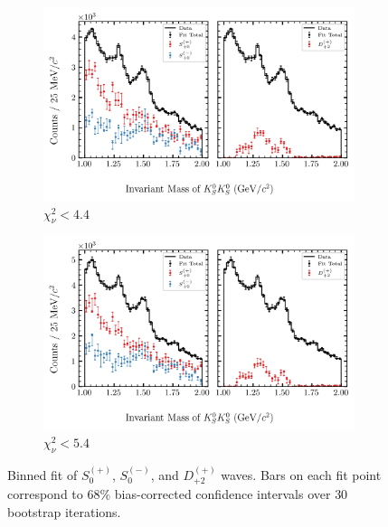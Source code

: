 \begin{figure}[htbp]
    \begin{subfigure}{0.45\textwidth}
        \includegraphics[width=\linewidth]{figures/binned_fit_chisqdof_4.4_splot_D_1s_2b_phase_factor_waves29099_uncertainty_bootstrap-CI-BC.png}
        \caption{$\chi^2_\nu < 4.4$}
    \end{subfigure}
    \hfill
    \begin{subfigure}{0.45\textwidth}
        \includegraphics[width=\linewidth]{figures/binned_fit_chisqdof_5.4_splot_D_1s_2b_phase_factor_waves29099_uncertainty_bootstrap-CI-BC.png}
        \caption{$\chi^2_\nu < 5.4$}
    \end{subfigure}

    \caption{Binned fit of $S_{0}^{(+)}$, $S_{0}^{(-)}$, and $D_{+2}^{(+)}$ waves. Bars on each fit point correspond to $68\%$ bias-corrected confidence intervals over $ 30 $ bootstrap iterations.}
    \label{fig:binned-fit-all-Spn-D2p}
\end{figure}

